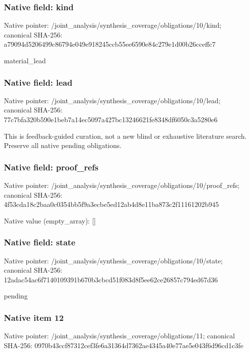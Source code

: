\documentclass[10pt,a4paper]{article}
\begin{document}
\subsubsection{Native field: kind}
Native pointer: /joint\_\allowbreak{}analysis/synthesis\_\allowbreak{}coverage/obligations/10/kind; canonical SHA-256: a79094d5206499c86794e049e918245ccb55ee6590e84c279e1d00b26cceffc7

\begingroup\raggedright\sloppy material\_\allowbreak{}lead\par\endgroup

\subsubsection{Native field: lead}
Native pointer: /joint\_\allowbreak{}analysis/synthesis\_\allowbreak{}coverage/obligations/10/lead; canonical SHA-256: 77c7bfa320b590e1beb7a14ec5097a427bc13246621fe8348df6050c3a5280e6

\begingroup\raggedright\sloppy This is feedback-guided curation,\allowbreak{} not a new blind or exhaustive literature search. Preserve all native pending obligations.\par\endgroup

\subsubsection{Native field: proof\_\allowbreak{}refs}
Native pointer: /joint\_\allowbreak{}analysis/synthesis\_\allowbreak{}coverage/obligations/10/proof\_\allowbreak{}refs; canonical SHA-256: 4f53cda18c2baa0c0354bb5f9a3ecbe5ed12ab4d8e11ba873c2f11161202b945

Native value (empty\_\allowbreak{}array): []

\subsubsection{Native field: state}
Native pointer: /joint\_\allowbreak{}analysis/synthesis\_\allowbreak{}coverage/obligations/10/state; canonical SHA-256: 12adac54ac6f7140109391b670b3cbcd51f083d8f5ee62ce26857c794ed67d36

\begingroup\raggedright\sloppy pending\par\endgroup

\subsubsection{Native item 12}
Native pointer: /joint\_\allowbreak{}analysis/synthesis\_\allowbreak{}coverage/obligations/11; canonical SHA-256: 0970b43ccf87312cef3fe6a31364d7362ae4345a40e77ae5e043f6d96cd1c3fe
\end{document}
